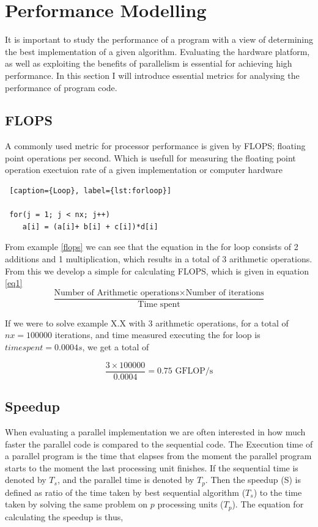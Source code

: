 
\section{Performance Modelling}
It is important to study the performance of a program with a view of determining the best implementation of a given algorithm. Evaluating the hardware platform, as well as exploiting the benefits of parallelism is essential for achieving high performance. In this section I will introduce essential metrics for analysing the performance of program code.

\subsection{FLOPS}
\label{subsec:flops}
A commonly used metric for processor performance is given by FLOPS; floating point operations per second. Which is usefull for measuring the floating point operation exectuion rate of a given implementation or computer hardware

\begin{lstlisting} [caption={Loop}, label={lst:forloop}]

 for(j = 1; j < nx; j++)
 	a[i] = (a[i]+ b[i] + c[i])*d[i]

\end{lstlisting}

From example \ref{flops} we can see that the equation in the for loop consists of  2 additions and 1 multiplication, which results in a total of 3 arithmetic operations. From this we develop a simple for calculating FLOPS, which is given in equation \ref{eq1}
\begin{equation} \label{eq1}
\frac{\textrm{Number of Arithmetic operations} \times \textrm{Number of iterations}}{\textrm{Time spent}} 
\end{equation}

If we were to solve example X.X with 3 arithmetic operations, for a total of 
 \(nx = 100 000\) iterations, and time measured executing the for loop is  \(time spent = 0.0004 s\), we get a total of
 
 \begin{equation} 
\frac{3 \times 100 000}{0.0004} = 0.75 \textrm{ GFLOP/s}
\end{equation}

\subsection{Speedup}
When evaluating a parallel implementation we are often interested in how much faster the parallel code is compared to the sequential code.
The Execution time of a parallel program is the time that elapses from the moment the parallel program starts to the moment the last processing unit finishes. If the sequential time is denoted by \(T_s\), and the parallel time is denoted by \(T_p\). Then the speedup (S) is defined as ratio of the time taken by best sequential algorithm (\(T_s\)) to the time taken by solving the same problem on \(p\) processing units (\(T_p\)). The equation for calculating the speedup is thus, 

